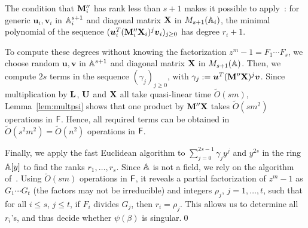   The condition that $\mat M''_i$ has rank less than $s+1$ makes it
  possible to apply~\cite[Lemma~2]{KaSa91}: for generic
  $\boldsymbol{u}_i, \boldsymbol{v}_i$ in $\mathbb{A}_i^{s+1}$ and diagonal
  matrix $\mat X$ in $M_{s+1}(\mathbb{A}_i)$, the minimal polynomial of the
  sequence $(\boldsymbol{u}_i^T (\mat M''_i \mat X_i)^j
  \boldsymbol{v}_i)_{j \ge 0}$ has degree $r_i+1$.

  To compute these degrees without knowing the factorization $z^m-1 =
  F_1 \cdots F_s$, we choose random $\boldsymbol{u}, \boldsymbol{v}$
  in $\mathbb{A}^{s+1}$ and diagonal matrix $\mat X$ in $M_{s+1}(\mathbb{A})$.  Then,
  we compute $2s$ terms in the sequence $(\gamma_j)_{j\ge 0}$, with
  $\gamma_j:=\boldsymbol{u}^T (\mat M'' \mat X)^j
  \boldsymbol{v}$. Since multiplication by $\mat L$, $\mat U$ and
  $\mat X$ all take quasi-linear time $\tilde{O}(sm)$,
  Lemma~\ref{lem:multpsi} shows that one product by $\mat M'' \mat X$
  takes $\tilde{O}(sm^2)$ operations in ${\mathsf{F}}$. Hence, all required
  terms can be obtained in $\tilde{O}(s^2m^2)=\tilde{O}(n^2)$
  operations in ${\mathsf{F}}$.

  Finally, we apply the fast Euclidean algorithm to $\sum_{j=0}^{2s-1}
  \gamma_j y^j$ and $y^{2s}$ in the ring $\mathbb{A}[y]$ to find the ranks
  $r_1,\dots,r_s$.  Since $\mathbb{A}$ is not a field, we rely on the
  algorithm of~\cite{AcCoMa03,DaMMMScXi06}. Using $\tilde{O}(sm)$
  operations in ${\mathsf{F}}$, it reveals a partial factorization of $z^m-1$ as
  $G_1 \cdots G_t$ (the factors may not be irreducible) and integers
  $\rho_j$, $j=1,\dots,t$, such that for all $i \le s$, $j\le t$, if
  $F_i$ divides $G_j$, then $r_i=\rho_j$. This allows us to determine all
  $r_i$'s, and thus decide whether $\psi(\beta)$ is singular.\qed






